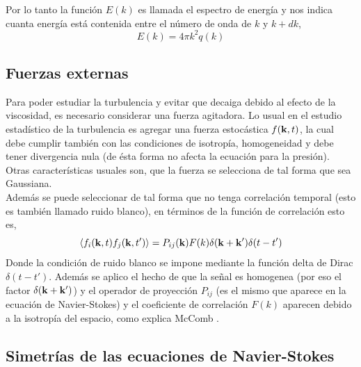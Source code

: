 \documentclass[executivepaper,12pt]{article}
\numberwithin{equation}{section}
\begin{document}
Por lo tanto la función $E(k)$ es llamada el espectro de energía y nos indica cuanta energía está contenida entre el número de onda de $k$ y $k+dk$,
\begin{equation}
	E(k)=4\pi k^2 q(k)
	\label{eq.ener3}
\end{equation}


\subsection{Fuerzas externas}
Para poder estudiar la turbulencia y evitar que decaiga debido al efecto de la viscosidad, es necesario considerar una fuerza agitadora. Lo usual en el estudio estadístico de la turbulencia es agregar una fuerza estocástica $f(\vb{k},t)$, la cual debe cumplir también con las condiciones de isotropía, homogeneidad y debe tener divergencia nula (de ésta forma no afecta la ecuación para la presión). Otras características usuales son, que la fuerza se selecciona de tal forma que sea Gaussiana.\\
Además se puede seleccionar de tal forma que no tenga correlación temporal (esto es también llamado ruido blanco), en términos de la función de correlación esto es,
\begin{equation*}
	\langle f_i(\vb{k},t) f_j(\vb{k},t') \rangle=P_{ij}(\vb{k})F(k)\delta(\vb{k}+\vb{k}')\delta(t-t')
\end{equation*} 
Donde la condición de ruido blanco se impone mediante la función delta de Dirac $\delta(t-t')$. Además se aplico el hecho de que la señal es homogenea (por eso el factor $\delta(\vb{k}+\vb{k}')$) y el operador de proyección $P_{ij}$ (es el mismo que aparece en la ecuación de Navier-Stokes) y el coeficiente de correlación $F(k)$ aparecen debido a la isotropía del espacio, como explica McComb \parencite{mccomb2014}.


\subsection{Simetrías de las ecuaciones de Navier-Stokes}
\end{document}
